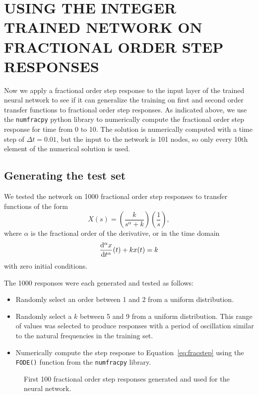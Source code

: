 \section{USING THE INTEGER TRAINED NETWORK ON FRACTIONAL ORDER STEP RESPONSES}
\label{sec:generalize}

Now we apply a fractional order step response to the input layer of the trained
neural network to see if it can generalize the training on first and second
order transfer functions to fractional order step responses. As indicated above,
we use the \texttt{numfracpy} python library to numerically compute the
fractional order step response for time from 0 to 10. The solution is
numerically computed with a time step of $\Delta t = 0.01$, but the input to the
network is 101 nodes, so only every 10th element of the numerical solution is
used.

\subsection{Generating the test set}
We tested the network on 1000 fractional order step responses to transfer
functions of the form
\[
  X(s) = \left( \frac{k}{s^\alpha + k} \right) \left( \frac{1}{s} \right),
\]
where $\alpha$ is the fractional order of the derivative, or in the time domain
\begin{equation}
\frac{\mathrm{d}^\alpha x}{\mathrm{d} t^\alpha}(t) + k x(t) = k
\label{eq:fracstep}
\end{equation}
with zero initial conditions. 

The 1000 responses were each generated and tested as follows: 
\begin{itemize}
\item Randomly select an order between 1 and 2 from a uniform distribution.
\item Randomly select a $k$ between 5 and 9 from a uniform distribution. This
  range of values was selected to produce responses with a period of oscillation
  similar to the natural frequencies in the training set.
\item Numerically compute the step response to Equation~\ref{eq:fracstep} using
the \texttt{FODE()} function from the \texttt{numfracpy} library. 
\end{itemize}

\begin{figure}
\centering

\vspace*{-5pt}
\caption{First 100 fractional order step responses generated and used for the
neural network.}
\label{fig:accuracy}
\end{figure}

